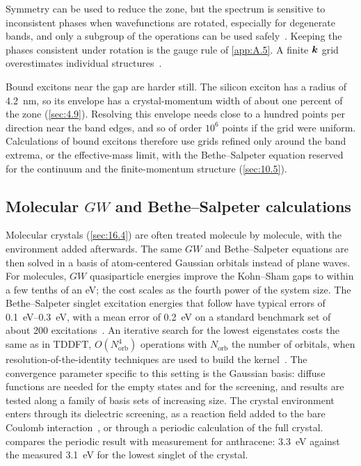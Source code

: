Symmetry can be used to reduce the zone, but the spectrum is sensitive to inconsistent phases when wavefunctions are rotated, especially for degenerate bands, and only a subgroup of the operations can be used safely~\cite{albrecht1998ab}. Keeping the phases consistent under rotation is the gauge rule of \cref{app:A.5}. A finite $\bm{k}$ grid overestimates individual structures~\cite{albrecht1998ab}.

Bound excitons near the gap are harder still. The silicon exciton has a radius of \SI{4.2}{nm}, so its envelope has a crystal-momentum width of about one percent of the zone (\cref{sec:4.9}). Resolving this envelope needs close to a hundred points per direction near the band edges, and so of order $10^6$ points if the grid were uniform. Calculations of bound excitons therefore use grids refined only around the band extrema, or the effective-mass limit, with the Bethe--Salpeter equation reserved for the continuum and the finite-momentum structure (\cref{sec:10.5}).

\subsection{Molecular \texorpdfstring{$GW$}{GW} and Bethe--Salpeter calculations}

Molecular crystals (\cref{sec:16.4}) are often treated molecule by molecule, with the environment added afterwards. The same $GW$ and Bethe--Salpeter equations are then solved in a basis of atom-centered Gaussian orbitals instead of plane waves. For molecules, $GW$ quasiparticle energies improve the Kohn--Sham gaps to within a few tenths of an eV; the cost scales as the fourth power of the system size. The Bethe--Salpeter singlet excitation energies that follow have typical errors of \SIrange{0.1}{0.3}{eV}, with a mean error of \SI{0.2}{eV} on a standard benchmark set of about 200 excitations~\cite{blase2020bethe}. An iterative search for the lowest eigenstates costs the same as in TDDFT, $O(N_{\mathrm{orb}}^4)$ operations with $N_{\mathrm{orb}}$ the number of orbitals, when resolution-of-the-identity techniques are used to build the kernel~\cite{blase2020bethe}. The convergence parameter specific to this setting is the Gaussian basis: diffuse functions are needed for the empty states and for the screening, and results are tested along a family of basis sets of increasing size. The crystal environment enters through its dielectric screening, as a reaction field added to the bare Coulomb interaction~\cite{blase2020bethe}, or through a periodic calculation of the full crystal.  compares the periodic result with measurement for anthracene: \SI{3.3}{eV} against the measured \SI{3.1}{eV} for the lowest singlet of the crystal.

